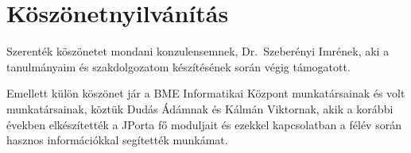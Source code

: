 \chapter*{Köszönetnyilvánítás}

Szerenték köszönetet mondani konzulensemnek, Dr.~Szeberényi Imrének, aki a tanulmányaim és szakdolgozatom készítésének során végig támogatott.

Emellett külön köszönet jár a BME Informatikai Központ munkatársainak és volt munkatársainak, köztük Dudás Ádámnak és Kálmán Viktornak, akik a korábbi években elkészítették a JPorta fő moduljait és ezekkel kapcsolatban a félév során hasznos információkkal segítették munkámat.